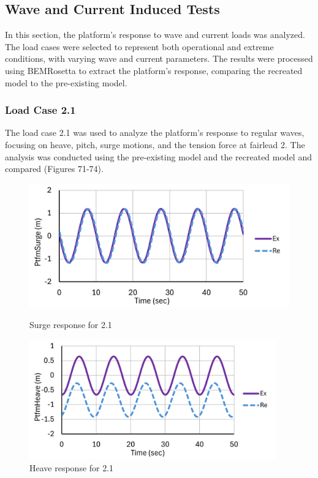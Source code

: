 \documentclass[a4paper, 11pt]{article}
\begin{document}
\subsection{Wave and Current Induced Tests}
\hspace*{0.5cm}In this section, the platform's response to wave and current loads was analyzed. The load cases were selected to represent both operational and extreme conditions, with varying wave and current parameters. The results were processed using BEMRosetta to extract the platform's response, comparing the recreated model to the pre-existing model.

\subsubsection{Load Case 2.1}
\hspace*{0.5cm}The load case 2.1 was used to analyze the platform’s response to regular waves, focusing on heave, pitch, surge motions, and the tension force at fairlead 2. The analysis was conducted using the pre-existing model and the recreated model and compared (Figures 71-74).

\begin{figure}[H]
    \begin{minipage}{0.48\textwidth}
        \centering
        \includegraphics[width=1\textwidth]{2.1_surge_mine_1.png}
        \caption{\small Surge response for 2.1}
        \label{fig:2.1_surge_mine_recreated}
    \end{minipage}
    \hfill
    \begin{minipage}{0.5\textwidth}
        \centering
        \includegraphics[width=0.95\textwidth]{2.1_heave_mine_1.png}
        \caption{\small Heave response for 2.1}
        \label{fig:2.1_heave_mine_recreated}
    \end{minipage}
\end{figure}
\end{document}

